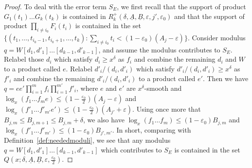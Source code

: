 \documentclass{amsart}
\numberwithin{equation}{section}
\begin{document}
\begin{proof}
  To deal with the error term $S_E$, we first recall 
 that   the support of   product $G_{1}(t_1) \dots G_{k}(t_k)$ is  contained in   $  R_k^+(\delta,\underline{A},\underline{B},\varepsilon,j',\varepsilon_0)$ and that the   support of  product $\prod_{i\neq i_0} F_{i}(t_i) $ is contained in the set $\{(t_1, \dots, t_{i_0-1},t_{i_0+1}, \dots, t_k): \sum_{i \neq i_0} t_i < (1-\varepsilon_0)(A_j-\varepsilon)\}$.  Consider  modulus $q = W [d_1,d'_1] \dots [d_{k-1},d'_{k-1}]$, and assume the modulus contributes to $S_E$. Relabel those $d_i$ which satisfy $d_i \geq x^\delta$ as $f_i$ and combine the remaining $d_i$ and $W$ to a product called $e$. Relabel $d'_i/(d_i,d'_i)$ which satisfy $d'_i/(d_i,d'_i) \geq x^\delta$ as $f'_i$ and combine the remaining $d'_i/(d_i,d'_i) $ to a product called $e'$. Then we have $ q=e e' \prod_{i=1}^m f_i \prod_{i=1}^{m'} f'_i$,    where $e$ and $e'$ are $x^\delta$-smooth and $ \log_x(f_1 \dots f_m e) \leq (1-\frac{\varepsilon_0}{2})(A_j-\varepsilon)$ and $\log_x(f'_1 \dots f'_{m'} e') \leq (1-\frac{\varepsilon_0}{2})(A_{j'}+\varepsilon)$. Using once more that $B_{j,m} \leq B_{j,m+1} \leq B_{j,m} + \delta$, we also have  $ \log_x(f_1 \dots f_m) \leq (1-\varepsilon_0)B_{j,m}$ and  $\log_x(f'_1 \dots f'_{m'}) \leq  (1-\varepsilon_0)B_{j',m'}$. In short, comparing with Definition~\ref{def:neededmoduli}, we see that any modulus  $q = W [d_1,d'_1] \dots [d_{k-1},d'_{k-1}]$ which contributes to $S_E$ is contained in the set $Q(x;\delta,\underline{A},\underline{B},\varepsilon,\frac{\varepsilon_0}{2})$.
 

\end{proof}
\end{document}
